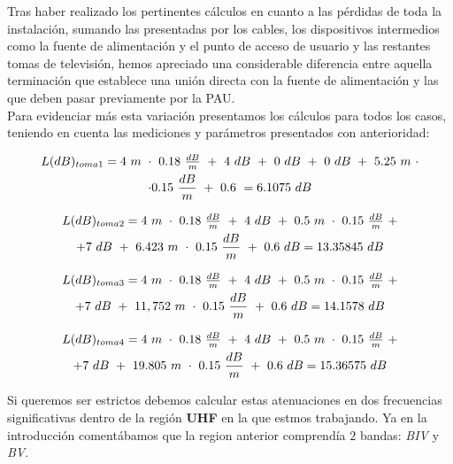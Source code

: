 \documentclass{article}[12 pt]
\begin{document}
		\vskip 3mm

		Tras haber realizado los pertinentes cálculos en cuanto a las pérdidas de toda la instalación, sumando las presentadas por los cables, los dispositivos intermedios como la fuente de alimentación y el punto de acceso de usuario y las restantes tomas de televisión, hemos apreciado una considerable diferencia entre aquella terminación que establece una unión directa con la fuente de alimentación y las que deben pasar previamente por la PAU.\\

		Para evidenciar más esta variación presentamos los cálculos para todos los casos, teniendo en cuenta las mediciones y parámetros presentados con anterioridad:

		\begin{multline*}
			$$L(dB)_{toma1} = 4\ m\ \cdot\ 0.18\ \frac{dB}{m}\ +\ 4\ dB\ +\ 0\ dB\ +\ 0\ dB\ +\ 5.25\ m\ \cdot\\
			\cdot 0.15\ \frac{dB}{m}\ +\ 0.6\ = 6.1075\ dB$$
		\end{multline*}

		\begin{multline*}
			$$L(dB)_{toma2} = 4\ m\ \cdot\ 0.18\ \frac{dB}{m}\ +\ 4\ dB\ +\ 0.5\ m\ \cdot\ 0.15\ \frac{dB}{m}\ +\\
			+ 7\ dB\ +\ 6.423\ m\ \cdot\ 0.15\ \frac{dB}{m}\ +\ 0.6\ dB = 13.35845\ dB$$
		\end{multline*}

		\begin{multline*}
			$$L(dB)_{toma3} = 4\ m\ \cdot\ 0.18\ \frac{dB}{m}\ +\ 4\ dB\ +\ 0.5\ m\ \cdot\ 0.15\ \frac{dB}{m}\ +\\
			+ 7\ dB\ +\ 11,752\ m\ \cdot\ 0.15\ \frac{dB}{m}\ +\ 0.6\ dB = 14.1578\ dB$$
		\end{multline*}

		\begin{multline*}
			$$L(dB)_{toma4} = 4\ m\ \cdot\ 0.18\ \frac{dB}{m}\ +\ 4\ dB\ +\ 0.5\ m\ \cdot\ 0.15\ \frac{dB}{m}\ +\\
			+ 7\ dB\ +\ 19.805\ m\ \cdot\ 0.15\ \frac{dB}{m}\ +\ 0.6\ dB = 15.36575\ dB$$
		\end{multline*}

		Si queremos ser estrictos debemos calcular estas atenuaciones en dos frecuencias significativas dentro de la región \textbf{UHF} en la que estmos trabajando. Ya en la introducción comentábamos que la region anterior comprendía $2$ bandas: \textit{BIV} y \textit{BV}.
\end{document}
